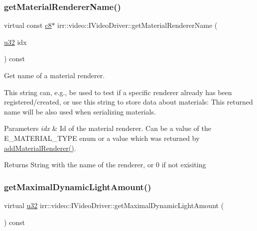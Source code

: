 \subsubsection{\texorpdfstring{get\+Material\+Renderer\+Name()}{getMaterialRendererName()}}
{\footnotesize\ttfamily virtual const \hyperlink{namespaceirr_a9395eaea339bcb546b319e9c96bf7410}{c8}$\ast$ irr\+::video\+::\+I\+Video\+Driver\+::get\+Material\+Renderer\+Name (\begin{DoxyParamCaption}\item[{\hyperlink{namespaceirr_a0416a53257075833e7002efd0a18e804}{u32}}]{idx }\end{DoxyParamCaption}) const\hspace{0.3cm}{\ttfamily [pure virtual]}}



Get name of a material renderer. 

This string can, e.\+g., be used to test if a specific renderer already has been registered/created, or use this string to store data about materials\+: This returned name will be also used when serializing materials. 
\begin{DoxyParams}{Parameters}
{\em idx} & Id of the material renderer. Can be a value of the E\+\_\+\+M\+A\+T\+E\+R\+I\+A\+L\+\_\+\+T\+Y\+PE enum or a value which was returned by \hyperlink{classirr_1_1video_1_1IVideoDriver_a0dfc3a7168f3a73a6f4323b579f03ff6}{add\+Material\+Renderer()}. \\
\hline
\end{DoxyParams}
\begin{DoxyReturn}{Returns}
String with the name of the renderer, or 0 if not exisiting 
\end{DoxyReturn}
\mbox{\label{classirr_1_1video_1_1IVideoDriver_ab64a2875011c8870fd011a486f3503ec}} 
\subsubsection{\texorpdfstring{get\+Maximal\+Dynamic\+Light\+Amount()}{getMaximalDynamicLightAmount()}}
{\footnotesize\ttfamily virtual \hyperlink{namespaceirr_a0416a53257075833e7002efd0a18e804}{u32} irr\+::video\+::\+I\+Video\+Driver\+::get\+Maximal\+Dynamic\+Light\+Amount (\begin{DoxyParamCaption}{ }\end{DoxyParamCaption}) const\hspace{0.3cm}{\ttfamily [pure virtual]}}



